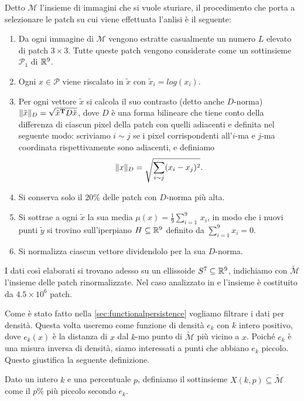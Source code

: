 Detto $\mathcal{M}$ l'insieme di immagini che si vuole sturiare, il procedimento che porta a selezionare le patch su cui viene effettuata l'anlisi è il seguente:
\begin{enumerate}
  \item Da ogni immagine di $\mathcal{M}$ vengono estratte casualmente un numero $L$ elevato di patch $3\times 3$. Tutte queste patch vengono considerate come un sottinsieme $\mathcal{P}_1$ di $\mathbb{R}^9$.
  \item Ogni $x\in\mathcal{P}$ viene riscalato in $\tilde{x}$ con $\tilde{x}_i = log(x_i)$.
  \item Per ogni vettore $\tilde{x}$ si calcola il suo contrasto (detto anche $D$-norma) $\normD{\tilde{x}}=\sqrt{\tilde{x}^\mathbf{T}D\tilde{x}}$, dove $D$ è una forma bilineare che tiene conto della differenza di ciascun pixel della patch con quelli adiacenti e definita nel seguente modo: scriviamo $i\sim j$ se i pixel corrispondenti all'$i$-ma e $j$-ma coordinata rispettivamente sono adiacenti, e definiamo
  \begin{equation*}
    \normD{x} = \sqrt{\sum_{i\sim j}(x_i-x_j)^2}.
  \end{equation*}
  \item Si conserva solo il $20\%$ delle patch con $D$-norma più alta.
  \item Si sottrae a ogni $\tilde{x}$ la sua media $\mu(x)=\displaystyle\frac{1}{9}\sum_{i=1}^9\,x_i$, in modo che i nuovi punti $\tilde{y}$ si trovino sull'iperpiano $H\subseteq\mathbb{R}^9$ definito da $\sum_{i=1}^9 x_i =0$.
  \item Si normalizza ciascun vettore dividendolo per la sua $D$-norma.
\end{enumerate}

I dati così elaborati si trovano adesso su un ellissoide $S^7\subseteq\mathbb{R}^9$, indichiamo con $\widetilde{\mathcal{M}}$ l'insieme delle patch rinormalizzate. Nel caso analizzato in \cite{Lee2003} e \cite{Carlsson2008} l'insieme è costituito da $4.5 \times 10^6$ patch.

Come è stato fatto nella \cref{sec:functionalpersistence} vogliamo filtrare i dati per densità. Questa volta useremo come funzione di densità $e_k$ con $k$ intero positivo, dove $e_k(x)$ è la distanza di $x$ dal $k$-mo punto di $\widetilde{\mathcal{M}}$ più vicino a $x$. Poiché $e_k$ è una misura inversa di densità, siamo interessati a punti che abbiano $e_k$ piccolo. Questo giustifica la seguente definizione.

\begin{definition}
  Dato un intero $k$ e una percentuale $p$, definiamo il sottinsieme $X(k,p)\subseteq\widetilde{\mathcal{M}}$ come il $p\%$ più piccolo secondo $e_k$.
\end{definition}

